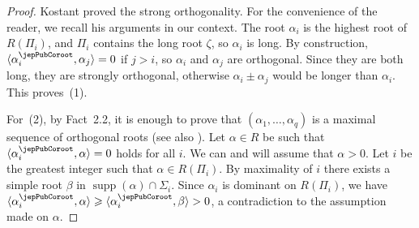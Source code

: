 \begin{proof}
Kostant \cite[Lem.~1.6]{jep93Kos12} proved the strong orthogonality. For the convenience of the reader, we recall his arguments in our context. The root $\alpha_i$ is the highest root of $R(\Pi_i)$, and $\Pi_i$ contains the long root $\zeta$, so $\alpha_i$ is long. By construction, $\langle\alpha_i^\jepPubCoroot,\alpha_j\rangle=0$ if $j>i$, so $\alpha_i$ and $\alpha_j$ are orthogonal. Since they are both long, they are strongly orthogonal, otherwise $\alpha_i\pm\alpha_j$ would be longer than $\alpha_i$. This proves~(1).

For~(2), by Fact~2.2, it is enough to prove that $(\alpha_1,\ldots,\alpha_q)$ is a maximal sequence of orthogonal roots (see also \cite[Th.~1.8]{jep93Kos12}). Let $\alpha\in R$ be such that $\langle\alpha_i^\jepPubCoroot,\alpha\rangle=0$ holds for all $i$. We can and will assume that $\alpha>0$. Let $i$ be the greatest integer such that $\alpha\in R(\Pi_i)$. By maximality of $i$ there exists a simple root $\beta$ in $\operatorname{supp}(\alpha)\cap\Sigma_i$. Since $\alpha_i$ is dominant on $R(\Pi_i)$, we have $\langle\alpha_i^\jepPubCoroot,\alpha\rangle\geqslant\langle\alpha_i^\jepPubCoroot,\beta\rangle>0$, a contradiction to the assumption made on $\alpha$.


\end{proof}
